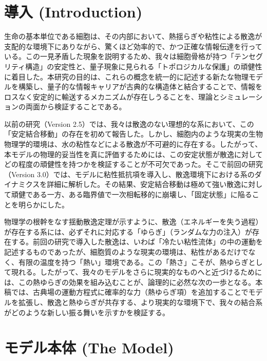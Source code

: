 \documentclass[a4paper,11pt,ja=standard,lualatex]{bxjsarticle}
\begin{document}
\FloatBarrier
\section{導入 (Introduction)}
生命の基本単位である細胞は、その内部において、熱揺らぎや粘性による散逸が支配的な環境下にありながら、驚くほど効率的で、かつ正確な情報伝達を行っている。この一見矛盾した現象を説明するため、我々は細胞骨格が持つ「テンセグリティ構造」の安定性と、量子現象に見られる「トポロジカルな保護」の頑健性に着目した。本研究の目的は、これらの概念を統一的に記述する新たな物理モデルを構築し、量子的な情報キャリアが古典的な構造体と結合することで、情報をロスなく安定的に輸送するメカニズムが存在しうることを、理論とシミュレーションの両面から検証することである。

以前の研究（Version 2.5）では、我々は散逸のない理想的な系において、この「安定結合移動」の存在を初めて報告した。しかし、細胞内のような現実の生物物理学的環境は、水の粘性などによる散逸が不可避的に存在する。したがって、本モデルの物理的妥当性を真に評価するためには、この安定状態が散逸に対してどの程度の頑健性を持つかを検証することが不可欠であった。そこで前回の研究（Version 3.0）では、モデルに粘性抵抗項を導入し、散逸環境下における系のダイナミクスを詳細に解析した。その結果、安定結合移動は極めて強い散逸に対して頑健である一方、ある臨界値で一次相転移的に崩壊し、「固定状態」に陥ることを明らかにした。

物理学の根幹をなす揺動散逸定理が示すように、散逸（エネルギーを失う過程）が存在する系には、必ずそれに対応する「ゆらぎ」（ランダムな力の注入）が存在する。前回の研究で導入した散逸は、いわば「冷たい粘性流体」の中の運動を記述するものであったが、細胞質のような現実の環境は、粘性があるだけでなく、有限の温度を持つ「熱い」環境である。この「熱さ」こそが、熱ゆらぎとして現れる。したがって、我々のモデルをさらに現実的なものへと近づけるためには、この熱ゆらぎの効果を組み込むことが、論理的に必然な次の一歩となる。本稿では、古典場の運動方程式に確率的な力（熱ゆらぎ項）を追加することでモデルを拡張し、散逸と熱ゆらぎが共存する、より現実的な環境下で、我々の結合系がどのような新しい振る舞いを示すかを検証する。

\FloatBarrier
\section{モデル本体 (The Model)}
\end{document}
